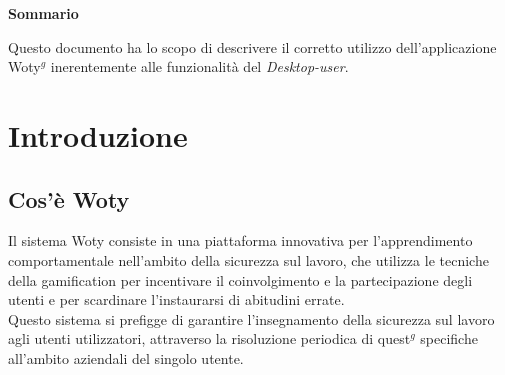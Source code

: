 

\newpage

\vspace*{0.5cm} %
\begin{center}

\textbf{{\huge{Sommario}}}

\vspace*{0.2cm} %

Questo documento ha lo scopo di descrivere il corretto utilizzo dell'applicazione Woty$^g$ inerentemente alle funzionalità del \textit{Desktop-user}.



\end{center}






\newpage
\tableofcontents %

\let\cleardoublepage\clearpage %






\newpage
\section{Introduzione}
	\subsection{Cos'è Woty}
Il sistema Woty consiste in una piattaforma innovativa per l'apprendimento comportamentale nell'ambito della sicurezza sul lavoro, che utilizza le tecniche della gamification per incentivare il coinvolgimento e la partecipazione degli utenti e per scardinare l'instaurarsi di abitudini errate.\\
Questo sistema si prefigge di garantire l'insegnamento della sicurezza sul lavoro agli utenti utilizzatori, attraverso la risoluzione periodica di quest$^g$ specifiche all'ambito aziendali del singolo utente.


